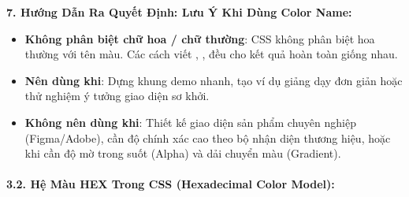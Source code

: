 \textbf{7. Hướng Dẫn Ra Quyết Định: Lưu Ý Khi Dùng Color Name:}

\begin{tipBox}
\begin{itemize}[leftmargin=1.5em, itemsep=3pt, parsep=0pt]
    \item \textbf{Không phân biệt chữ hoa / chữ thường}: CSS không phân biệt hoa thường với tên màu. Các cách viết , ,  đều cho kết quả hoàn toàn giống nhau.
    \item \textbf{Nên dùng khi}: Dựng khung demo nhanh, tạo ví dụ giảng dạy đơn giản hoặc thử nghiệm ý tưởng giao diện sơ khởi.
    \item \textbf{Không nên dùng khi}: Thiết kế giao diện sản phẩm chuyên nghiệp (Figma/Adobe), cần độ chính xác cao theo bộ nhận diện thương hiệu, hoặc khi cần độ mờ trong suốt (Alpha) và dải chuyển màu (Gradient).
\end{itemize}
\end{tipBox}

\paragraph{3.2. Hệ Màu HEX Trong CSS (Hexadecimal Color Model):}

